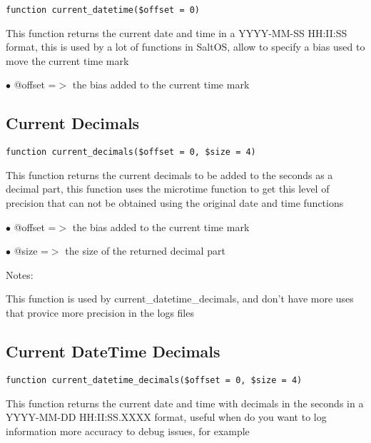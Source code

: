 \documentclass[a4paper]{book}
\begin{document}
\begin{lstlisting}
function current_datetime($offset = 0)
\end{lstlisting}

This function returns the current date and time in a YYYY-MM-SS HH:II:SS format,
this is used by a lot of functions in SaltOS, allow to specify a bias used to
move the current time mark

\begin{compactitem}
\item[\color{myblue}$\bullet$] @offset =$>$ the bias added to the current time mark
\end{compactitem}

\hypertarget{toc72}{}
\subsection{Current Decimals}

\begin{lstlisting}
function current_decimals($offset = 0, $size = 4)
\end{lstlisting}

This function returns the current decimals to be added to the seconds as a
decimal part, this function uses the microtime function to get this level of
precision that can not be obtained using the original date and time functions

\begin{compactitem}
\item[\color{myblue}$\bullet$] @offset =$>$ the bias added to the current time mark
\item[\color{myblue}$\bullet$] @size   =$>$ the size of the returned decimal part
\end{compactitem}

Notes:

This function is used by current\_datetime\_decimals, and don't have more uses
that provice more precision in the logs files

\hypertarget{toc73}{}
\subsection{Current DateTime Decimals}

\begin{lstlisting}
function current_datetime_decimals($offset = 0, $size = 4)
\end{lstlisting}

This function returns the current date and time with decimals in the seconds
in a YYYY-MM-DD HH:II:SS.XXXX format, useful when do you want to log information
more accuracy to debug issues, for example
\end{document}
